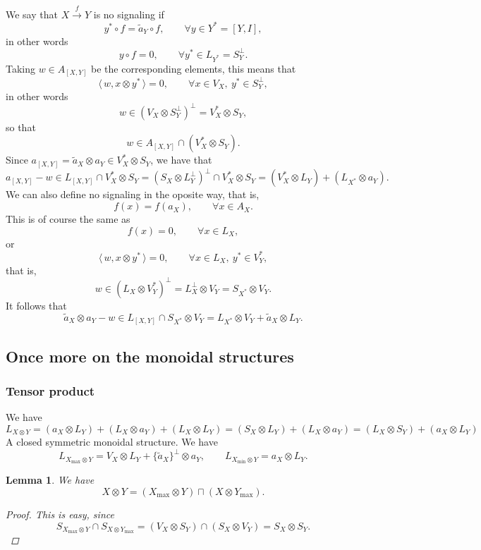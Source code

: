 \documentclass[12pt]{article}
\newtheorem{lemma}{Lemma}
\theoremstyle{definition}
\theoremstyle{remark}
\def\<{\langle\,}
\def\>{\,\rangle}
\begin{document}
We say that $X\xrightarrow{f} Y$ is no signaling if
\[
y^*\circ f=\tilde a_Y\circ f,\qquad \forall y\in Y^*=[Y,I],
\]
in other words
\[
y\circ f=0,\qquad \forall y^*\in L_{Y^*}=S_Y^\perp.
\]
Taking $w\in A_{[X,Y]}$ be the corresponding elements, this means that
\[
\<w,x\otimes y^*\>=0,\qquad \forall x\in V_X,\ y^*\in S_Y^\perp,
\]
in other words
\[
w\in (V_X\otimes S_Y^\perp)^\perp=V^*_X\otimes S_Y,
\]
so that
\[
w\in A_{[X,Y]}\cap (V^*_X\otimes S_Y).
\]
Since $a_{[X,Y]}=\tilde a_X\otimes a_Y\in V^*_X\otimes S_Y$, we have that
\[
a_{[X,Y]}-w\in L_{[X,Y]}\cap V^*_X\otimes S_Y=(S_X\otimes L_Y^\perp)^\perp\cap
V^*_X\otimes S_Y=(V_X^*\otimes L_Y)+ (L_{X^*}\otimes a_Y).
\]
We can also define no signaling in the oposite way, that is,
\[
f(x)=f(a_X),\qquad \forall x\in A_X.
\]
This is of course the same as 
\[
f(x)=0,\qquad \forall x\in L_X,
\]
or
\[
\<w,x\otimes y^*\>=0,\qquad \forall x\in L_X,\ y^*\in V_Y^*,
\]
that is,
\[
w\in (L_X\otimes V_Y^*)^\perp=L_X^\perp\otimes V_Y=S_{X^*}\otimes V_Y.
\]
It follows that
\[
\tilde a_X\otimes a_Y-w\in L_{[X,Y]}\cap S_{X^*}\otimes V_Y=L_{X^*}\otimes V_Y+\tilde
a_X\otimes L_Y.
\]

\subsection{Once more on the monoidal structures}

\subsubsection{Tensor product}

We have
\[
L_{X\otimes Y}=(a_X\otimes L_Y)+(L_X\otimes a_Y)+(L_X\otimes L_Y)=(S_X\otimes
L_Y)+(L_X\otimes a_Y)=(L_X\otimes S_Y)+(a_X\otimes L_Y)
\]
A closed symmetric monoidal structure. We have 
\[
L_{X_{\max} \otimes Y}=V_X\otimes L_Y+\{\tilde a_X\}^\perp\otimes a_Y,\qquad L_{X_{\min}\otimes Y}=a_X\otimes L_Y.
\]
\begin{lemma}\label{lemma:maxtensor}
We have
\[
X\otimes Y=(X_{\max}\otimes Y)\sqcap (X\otimes Y_{\max}). 
\]

\begin{proof} This is easy, since
\[
S_{X_{\max}\otimes Y}\cap S_{X\otimes Y_{\max}}=(V_X\otimes S_Y)\cap (S_X\otimes
V_Y)=S_X\otimes S_Y.
\]

\end{proof}

\end{lemma}
\end{document}
